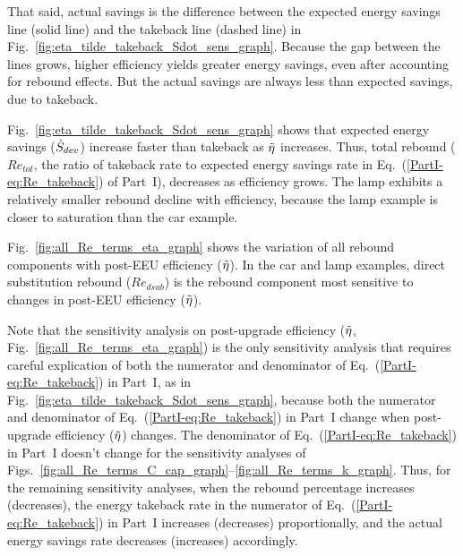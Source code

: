 \documentclass[12pt]{article}\usepackage[]{graphicx}\usepackage[]{xcolor}
\begin{document}
That said, actual savings is the difference between the expected energy savings line (solid line)
and the takeback line (dashed line) in Fig.~\ref{fig:eta_tilde_takeback_Sdot_sens_graph}.
Because the gap between the lines grows, 
higher efficiency yields greater energy savings,
even after accounting for rebound effects.
But the actual savings are always less than expected savings, due to takeback.

Fig.~\ref{fig:eta_tilde_takeback_Sdot_sens_graph} shows that
expected energy savings ($\dot{S}_{dev}$) increase faster than takeback 
as $\tilde{\eta}$ increases.
Thus, total rebound ($Re_{tot}$, the ratio of 
takeback rate to expected energy savings rate in Eq.~(\ref{PartI-eq:Re_takeback}) of Part~I),
decreases as efficiency grows.
The lamp exhibits a relatively smaller rebound decline with efficiency,
because the lamp example is closer to saturation than the car example.

Fig.~\ref{fig:all_Re_terms_eta_graph} shows the variation of all rebound components
with post-EEU efficiency ($\tilde{\eta}$).
In the car and lamp examples, 
direct substitution rebound ($Re_{dsub}$) is the 
rebound component 
most sensitive to changes in post-EEU efficiency ($\tilde{\eta}$).

Note that the sensitivity analysis on post-upgrade efficiency 
($\tilde{\eta}$, Fig.~\ref{fig:all_Re_terms_eta_graph})
is the only sensitivity analysis that requires careful explication
of both the numerator and denominator of Eq.~(\ref{PartI-eq:Re_takeback}) in Part~I,
as in Fig.~\ref{fig:eta_tilde_takeback_Sdot_sens_graph}, 
because both the numerator and denominator of Eq.~(\ref{PartI-eq:Re_takeback}) in Part~I
change when post-upgrade efficiency ($\tilde{\eta}$) changes.
The denominator of Eq.~(\ref{PartI-eq:Re_takeback}) in Part~I doesn't change for
the sensitivity analyses of Figs.~\ref{fig:all_Re_terms_C_cap_graph}--\ref{fig:all_Re_terms_k_graph}.
Thus, for the remaining sensitivity analyses, 
when the rebound percentage increases (decreases), 
the energy takeback rate in the numerator of Eq.~(\ref{PartI-eq:Re_takeback}) in Part~I
increases (decreases) proportionally,
and the actual energy savings rate decreases (increases) accordingly.
\end{document}
